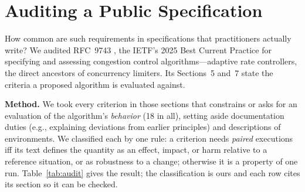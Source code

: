 \documentclass[conference]{IEEEtran}
\begin{document}
	\section{Auditing a Public Specification}
	\label{sec:audit}
	
	How common are such requirements in specifications that practitioners
	actually write? We audited RFC~9743 \cite{rfc9743}, the IETF's 2025 Best
	Current Practice for specifying and assessing congestion control
	algorithms---adaptive rate controllers, the direct ancestors of
	concurrency limiters. Its Sections~5 and~7 state the criteria a proposed
	algorithm is evaluated against.
	
	\textbf{Method.} We took every criterion in those sections that
	constrains or asks for an evaluation of the algorithm's \emph{behavior}
	(18 in all), setting aside documentation duties (e.g., explaining
	deviations from earlier principles) and descriptions of environments. We
	classified each by one rule: a criterion needs \emph{paired} executions
	iff its text defines the quantity as an effect, impact, or harm relative
	to a reference situation, or as robustness to a change; otherwise it is
	a property of one run. Table~\ref{tab:audit} gives the result; the
	classification is ours and each row cites its section so it can be
	checked.
	
\end{document}
